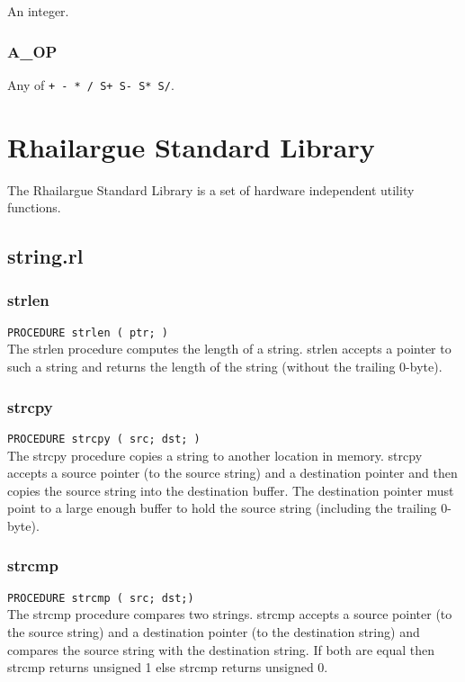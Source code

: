 An integer.

\subsubsection{A\_OP}

Any of \verb|+ - * / S+ S- S* S/|.  

\section{Rhailargue Standard Library}

The Rhailargue Standard Library is a set of hardware independent utility functions.

\subsection{string.rl}

\subsubsection{strlen}

\verb|PROCEDURE strlen ( ptr; )|\\
The strlen procedure computes the length of a string. strlen accepts a pointer to such a string and returns the length of the string (without the
trailing 0-byte).

\subsubsection{strcpy}

\verb|PROCEDURE strcpy ( src; dst; )|\\
The strcpy procedure copies a string to another location in memory. strcpy
accepts a source pointer (to the source string) and a destination pointer and
then copies the source string into the destination buffer. The destination pointer
must point to a large enough buffer to hold the source string (including the trailing 0-byte).

\subsubsection{strcmp}

\verb|PROCEDURE strcmp ( src; dst;)|\\
The strcmp procedure compares two strings. strcmp accepts a source pointer
(to the source string) and a destination pointer (to the destination string)
and compares the source string with the destination string. If both are equal
then strcmp returns unsigned 1 else strcmp returns unsigned 0.
